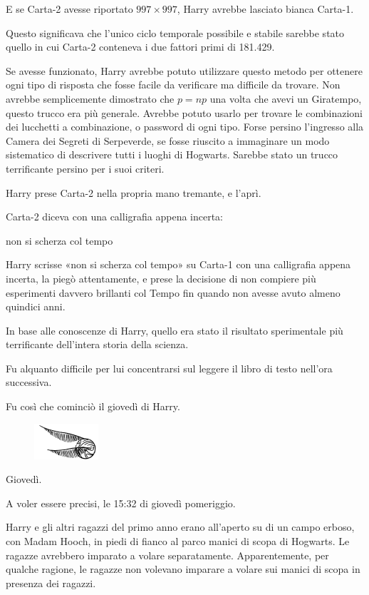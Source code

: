 E se Carta-2 avesse riportato $997 \times 997$, Harry avrebbe lasciato bianca Carta-1.

Questo significava che l’unico ciclo temporale possibile e stabile sarebbe stato quello in cui Carta-2 conteneva i due fattori primi di 181.429.

Se avesse funzionato, Harry avrebbe potuto utilizzare questo metodo per ottenere ogni tipo di risposta che fosse facile da verificare ma difficile da trovare. Non avrebbe semplicemente dimostrato che $p = np$ una volta che avevi un Giratempo, questo trucco era più generale. Avrebbe potuto usarlo per trovare le combinazioni dei lucchetti a combinazione, o password di ogni tipo. Forse persino l’ingresso alla Camera dei Segreti di Serpeverde, se fosse riuscito a immaginare un modo sistematico di descrivere tutti i luoghi di Hogwarts. Sarebbe stato un trucco terrificante persino per i suoi criteri.

Harry prese Carta-2 nella propria mano tremante, e l’aprì.

Carta-2 diceva con una calligrafia appena incerta:

non si scherza col tempo

Harry scrisse «non si scherza col tempo» su Carta-1 con una calligrafia appena incerta, la piegò attentamente, e prese la decisione di non compiere più esperimenti davvero brillanti col Tempo fin quando non avesse avuto almeno quindici anni.

In base alle conoscenze di Harry, quello era stato il risultato sperimentale più terrificante dell’intera storia della scienza.

Fu alquanto difficile per lui concentrarsi sul leggere il libro di testo nell’ora successiva.

Fu così che cominciò il giovedì di Harry.

\begin{figure}[h!]
        \includegraphics[scale=0.4]{boccino.png}
        \centering
\end{figure}

Giovedì.

A voler essere precisi, le 15:32 di giovedì pomeriggio.

Harry e gli altri ragazzi del primo anno erano all’aperto su di un campo erboso, con Madam Hooch, in piedi di fianco al parco manici di scopa di Hogwarts. Le ragazze avrebbero imparato a volare separatamente. Apparentemente, per qualche ragione, le ragazze non volevano imparare a volare sui manici di scopa in presenza dei ragazzi.

